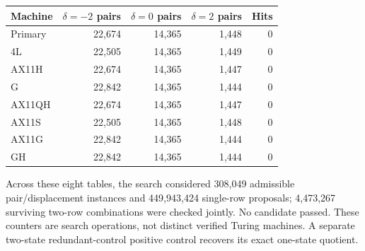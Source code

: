 \begin{center}\small
\begin{tabular}{lrrrr}
\toprule Machine & $\delta=-2$ pairs & $\delta=0$ pairs & $\delta=2$ pairs & Hits\\\midrule
Primary & 22,674 & 14,365 & 1,448 & 0 \\
4L & 22,505 & 14,365 & 1,449 & 0 \\
AX11H & 22,674 & 14,365 & 1,447 & 0 \\
G & 22,842 & 14,365 & 1,444 & 0 \\
AX11QH & 22,674 & 14,365 & 1,447 & 0 \\
AX11S & 22,505 & 14,365 & 1,448 & 0 \\
AX11G & 22,842 & 14,365 & 1,444 & 0 \\
GH & 22,842 & 14,365 & 1,444 & 0 \\
\bottomrule\end{tabular}\end{center}
Across these eight tables, the search considered 308,049 admissible pair/displacement instances and 449,943,424 single-row proposals; 4,473,267 surviving two-row combinations were checked jointly. No candidate passed. These counters are search operations, not distinct verified Turing machines. A separate two-state redundant-control positive control recovers its exact one-state quotient.
